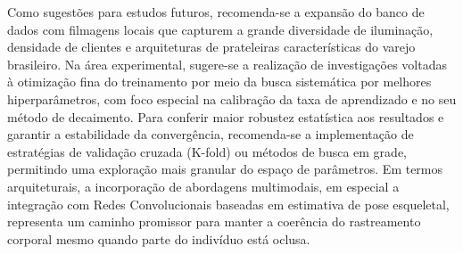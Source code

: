 \documentclass[12pt, %
openright, 
oneside, %
a4paper,    %
brazil]{facom-ufu-abntex2}
\begin{document}
Como sugestões para estudos futuros, recomenda-se a expansão do banco de dados com filmagens locais que capturem a grande diversidade de iluminação, densidade de clientes e arquiteturas de prateleiras características do varejo brasileiro. Na área experimental, sugere-se a realização de investigações voltadas à otimização fina do treinamento por meio da busca sistemática por melhores hiperparâmetros, com foco especial na calibração da taxa de aprendizado e no seu método de decaimento. Para conferir maior robustez estatística aos resultados e garantir a estabilidade da convergência, recomenda-se a implementação de estratégias de validação cruzada (K-fold) ou métodos de busca em grade, permitindo uma exploração mais granular do espaço de parâmetros. Em termos arquiteturais, a incorporação de abordagens multimodais, em especial a integração com Redes Convolucionais baseadas em estimativa de pose esqueletal, representa um caminho promissor para manter a coerência do rastreamento corporal mesmo quando parte do indivíduo está oclusa.









\postextual





\end{document}

